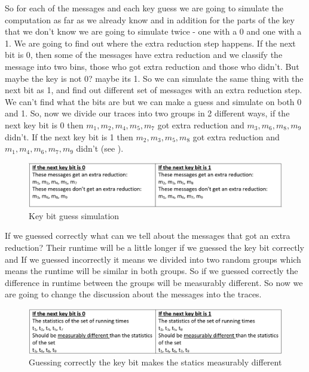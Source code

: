 So for each of the messages and each key guess we are going to simulate the
computation as far as we already know and in addition for the parts of the key
that we don't know we are going to simulate twice - one with a 0 and one with a
1. We are going to find out where the extra reduction step happens. If the next
bit is 0, then some of the messages have extra reduction and we classify the message into
two bins, those who got extra reduction and those who didn't. But maybe the key
is not 0? maybe its 1. So we can simulate the same thing with the next bit as 1,
and find out different set of messages with an extra reduction step. We can't
find what the bits are but we can make a guess and simulate on both 0 and 1. So,
now we divide our traces into two groups in 2 different ways, if the next key
bit is 0 then \(m_1,m_2,m_4,m_5,m_7\) got extra reduction and \(m_3,m_6,m_8,m_9\)
didn't. If the next key bit is 1 then \(m_2,m_3,m_5,m_8\) got extra reduction and
\(m_1,m_4,m_6,m_7,m_9\) didn't (see ). 


\begin{figure}[!ht]
    \centering
    \includegraphics[scale=0.3]{images/extraRed.PNG}
    \caption{Key bit guess simulation} \label{fig:extraRed}
\end{figure}

If we guessed correctly what can we tell about the messages that got an extra
reduction? Their runtime will be a little longer if we guessed the key bit
correctly and If we guessed incorrectly it means we divided into two random
groups which means the runtime will be similar in both groups. So if we guessed
correctly the difference in runtime between the groups will be measurably
different. So now we are going to change the discussion about the messages into
the traces.

\begin{figure}[!ht]
    \centering
    \includegraphics[scale=0.3]{images/extraStat.PNG}
    \caption{Guessing correctly the key bit makes the statics measurably different} \label{fig:extraStat}
\end{figure}


